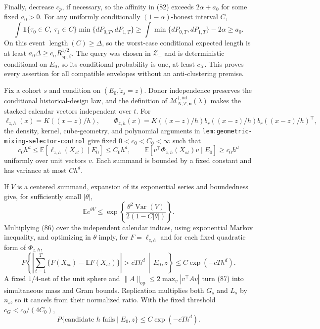 Finally, decrease \(c_p\), if necessary, so the affinity in (82) exceeds \(2\alpha+a_0\) for some fixed \(a_0>0\).  For any uniformly conditionally \((1-\alpha)\)-honest interval \(C\),
\[
\int\mathbf1\{\tau_0\in C,\ \tau_1\in C\}
\min\{dP_{0,T},dP_{1,T}\}
\geq\int\min\{dP_{0,T},dP_{1,T}\}-2\alpha
\geq a_0.
\]
On this event \(\operatorname{length}(C)\geq\Delta\), so the worst-case conditional expected length is at least
\(a_0\Delta\geq c_\alpha R_{\mathrm{sp},\beta}^{1/2}\).  The query was chosen in \(\mathcal Z_+\) and is deterministic conditional on \(E_0\), so its conditional probability is one, at least \(c_X\).  This proves every assertion for all compatible envelopes without an anti-clustering premise.

Fix a cohort \(s\) and condition on \((E_0,\widetilde z_s=z)\).  Donor independence preserves the conditional historical-design law, and the definition of \(\mathcal M_{N,T,\mathbf n}^{\dagger,\mathrm{iid}}(\lambda)\) makes the stacked calendar vectors independent over \(t\).  For
\[
\ell_{z,h}(x)=K((x-z)/h),
\qquad
\Phi_{z,h}(x)=K((x-z)/h)b_r((x-z)/h)b_r((x-z)/h)^\top,
\]
the density, kernel, cube-geometry, and polynomial arguments in \texttt{lem:geometric-mixing-selector-control} give fixed \(0<c_0<C_0<\infty\) such that
\[
c_0h^d\leq\mathbb E[\ell_{z,h}(X_{st})\mid E_0]
\leq C_0h^d,
\qquad
\mathbb E[v^\top\Phi_{z,h}(X_{st})v\mid E_0]
\geq c_0h^d
\tag{85}
\]
uniformly over unit vectors \(v\).  Each summand is bounded by a fixed constant and has variance at most \(Ch^d\).

If \(V\) is a centered summand, expansion of its exponential series and boundedness give, for sufficiently small \(|\theta|\),
\[
\mathbb Ee^{\theta V}
\leq\exp\!\left\{
\frac{\theta^2\operatorname{Var}(V)}{2(1-C|\theta|)}
\right\}.
\tag{86}
\]
Multiplying (86) over the independent calendar indices, using exponential Markov inequality, and optimizing in \(\theta\) imply, for \(F=\ell_{z,h}\) and for each fixed quadratic form of \(\Phi_{z,h}\),
\[
P\!\left\{
\left|\sum_{t=1}^{T}\{F(X_{st})-\mathbb EF(X_{st})\}\right|>cTh^d
\,\middle|\,E_0,z\right\}
\leq C\exp(-cTh^d).
\tag{87}
\]
A fixed \(1/4\)-net of the unit sphere and
\(\|A\|_{\mathrm{op}}\leq2\max_v|v^\top Av|\) turn (87) into simultaneous mass and Gram bounds.  Replication multiplies both \(G_s\) and \(L_s\) by \(n_s\), so it cancels from their normalized ratio.  With the fixed threshold \(c_G<c_0/(4C_0)\),
\[
P\{\text{candidate }h\text{ fails}\mid E_0,z\}
\leq C\exp(-cTh^d).
\tag{88}
\]

